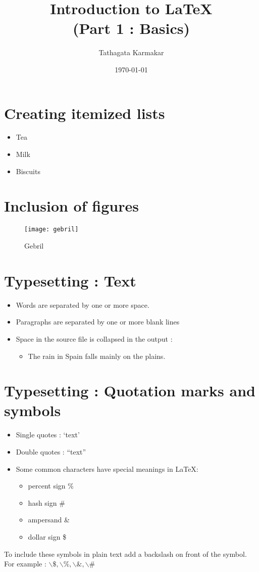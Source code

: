 \documentclass[12pt]{article}
\title{Introduction to \LaTeX \\ (Part 1 : Basics)}
\author{Tathagata Karmakar}
\date{\today}
\begin{document}
\maketitle

\section{Creating itemized lists}
\begin{itemize}
\item Tea
\item Milk
\item Biscuits
\end{itemize}

\section{Inclusion of figures}

\begin{figure}[h]
\centering
\texttt{[image: gebril]}
\caption{Gebril}
\end{figure}

\section{Typesetting : Text}
\begin{itemize}

\item Words are separated by one or more space.
\item Paragraphs are separated by 
one or more blank lines
\item Space in the source file is collapsed in the output :
\begin{itemize}
\item The rain    in Spain falls    mainly on   the plains.
\end{itemize}

\end{itemize}

\section{Typesetting : Quotation marks and symbols}
\begin{itemize}

\item Single quotes : `text'
\item Double quotes : ``text''
\item Some common characters have special meanings in \LaTeX :
\begin{itemize}
\item percent sign \%
\item hash sign \#
\item ampersand \&
\item dollar sign \$
\end{itemize}

\end{itemize}
To include these symbols in plain text add a backslash on front of the symbol. For example : $\backslash \$, \backslash \%, \backslash \&, \backslash \#$
\end{document}
